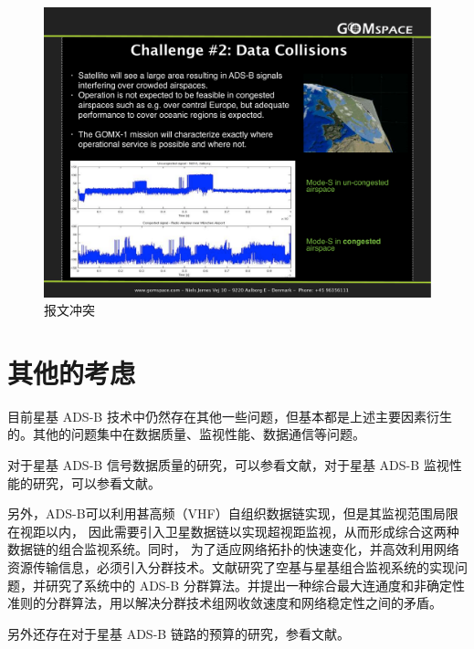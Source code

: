 \begin{figure}[!htb]
\centering
\includegraphics[width=12cm]{pic/data_collision.pdf}
\caption{报文冲突\protect\footnotemark}
\label{fig:data_collision}
\end{figure}


\section{其他的考虑}

目前星基 ADS-B 技术中仍然存在其他一些问题，但基本都是上述主要因素衍生的。其他的问题集中在数据质量、监视性能、数据通信等问题。

对于星基 ADS-B 信号数据质量的研究，可以参看文献\cite{z2}，对于星基 ADS-B 监视性能的研究，可以参看文献\cite{z4,z5,z6,e18}。

另外，ADS-B可以利用甚高频（VHF）自组织数据链实现，但是其监视范围局限在视距以内， 因此需要引入卫星数据链以实现超视距监视，从而形成综合这两种数据链的组合监视系统。同时， 为了适应网络拓扑的快速变化，并高效利用网络资源传输信息，必须引入分群技术。文献\cite{z3}研究了空基与星基组合监视系统的实现问题，并研究了系统中的 ADS-B 分群算法。并提出一种综合最大连通度和非确定性准则的分群算法，用以解决分群技术组网收敛速度和网络稳定性之间的矛盾。

另外还存在对于星基 ADS-B 链路的预算的研究，参看文献\cite{z9}。







